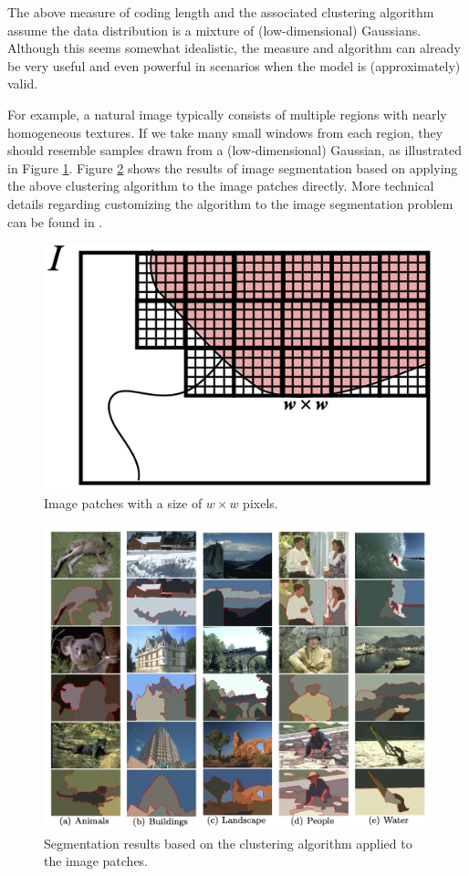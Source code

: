\documentclass[../../book-main.tex]{subfiles}
\begin{document}

\begin{example}\label{eg:image-segmentation} The above measure of coding length and the associated clustering algorithm assume the data distribution is a mixture of (low-dimensional) Gaussians. Although this seems somewhat idealistic, the measure and algorithm can already be very useful and even powerful in scenarios when the model is (approximately) valid.

	For example, a natural image typically consists of multiple regions with nearly homogeneous textures. If we take many small windows from each region, they should resemble samples drawn from a (low-dimensional) Gaussian, as illustrated in Figure \ref{fig:image-patch}. Figure \ref{fig:image-segmentation} shows the results of image segmentation based on applying the above clustering algorithm to the image patches directly. More technical details regarding customizing the algorithm to the image segmentation problem can be found in \cite{Mobahi-IJCV2011}.
\end{example}


\begin{figure}
	\centering
	\includegraphics[width=0.4\linewidth]{chapters/chapter3/figs/image-segmentation-tiles.png}
	\caption{Image patches with a size of $w\times w$ pixels.}
	\label{fig:image-patch}
\end{figure}

\begin{figure}[th]
	\centering
	\includegraphics[width=0.8\linewidth]{chapters/chapter3/figs/image-segmentation.png}
	\caption{Segmentation results based on the clustering algorithm applied to the image patches.}
	\label{fig:image-segmentation}
\end{figure}
\end{document}
